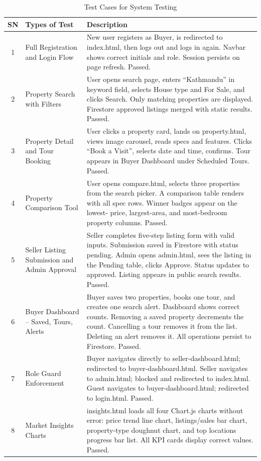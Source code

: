 \documentclass[12pt,a4paper]{report}
\begin{document}
\begin{table}[H]
\centering
\caption{Test Cases for System Testing}
\label{tab:system-tests}
\renewcommand{\arraystretch}{1.3}
\footnotesize
\begin{tabularx}{\textwidth}{|c|X|X|}
\hline
\textbf{SN} & \textbf{Types of Test} & \textbf{Description} \\
\hline
1 & Full Registration and Login Flow &
  New user registers as Buyer, is redirected to index.html, then logs out and logs
  in again. Navbar shows correct initials and role. Session persists on page
  refresh. Passed. \\
\hline
2 & Property Search with Filters &
  User opens search page, enters ``Kathmandu'' in keyword field, selects House type
  and For Sale, and clicks Search. Only matching properties are displayed. Firestore
  approved listings merged with static results. Passed. \\
\hline
3 & Property Detail and Tour Booking &
  User clicks a property card, lands on property.html, views image carousel, reads
  specs and features. Clicks ``Book a Visit'', selects date and time, confirms.
  Tour appears in Buyer Dashboard under Scheduled Tours. Passed. \\
\hline
4 & Property Comparison Tool &
  User opens compare.html, selects three properties from the search picker. A
  comparison table renders with all spec rows. Winner badges appear on the lowest-
  price, largest-area, and most-bedroom property columns. Passed. \\
\hline
5 & Seller Listing Submission and Admin Approval &
  Seller completes five-step listing form with valid inputs. Submission saved in
  Firestore with status pending. Admin opens admin.html, sees the listing in the
  Pending table, clicks Approve. Status updates to approved. Listing appears in
  public search results. Passed. \\
\hline
6 & Buyer Dashboard -- Saved, Tours, Alerts &
  Buyer saves two properties, books one tour, and creates one search alert.
  Dashboard shows correct counts. Removing a saved property decrements the count.
  Cancelling a tour removes it from the list. Deleting an alert removes it.
  All operations persist to Firestore. Passed. \\
\hline
7 & Role Guard Enforcement &
  Buyer navigates directly to seller-dashboard.html; redirected to
  buyer-dashboard.html. Seller navigates to admin.html; blocked and redirected to
  index.html. Guest navigates to buyer-dashboard.html; redirected to login.html.
  Passed. \\
\hline
8 & Market Insights Charts &
  insights.html loads all four Chart.js charts without error: price trend line
  chart, listings/sales bar chart, property-type doughnut chart, and top locations
  progress bar list. All KPI cards display correct values. Passed. \\
\hline
\end{tabularx}
\end{table}
\end{document}
